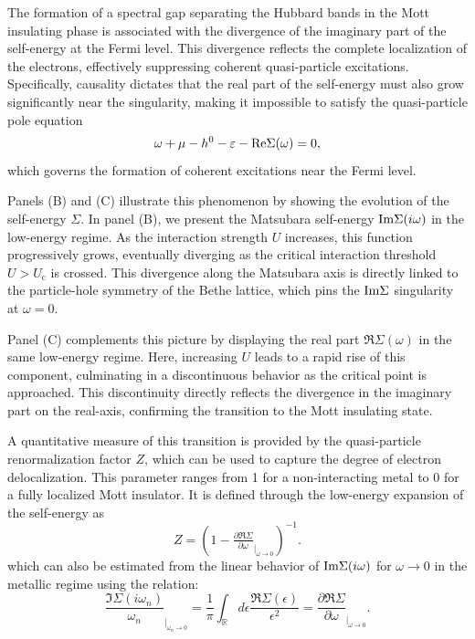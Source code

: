 \documentclass[edipack2.tex]{subfiles}
\begin{document}
The formation of a spectral gap separating the Hubbard bands in the 
Mott insulating phase is associated with the divergence of the 
imaginary part of the self-energy at the Fermi level. This divergence 
reflects the complete localization of the electrons, effectively 
suppressing coherent quasi-particle excitations. Specifically, 
causality dictates that the real part of the self-energy must also 
grow significantly near the singularity, making it impossible to 
satisfy the quasi-particle pole equation
$$
\omega+\mu-h^0-\varepsilon-{\rm Re}{\Sigma}(\omega)=0,
$$
which governs the formation of coherent excitations near the Fermi 
level.

Panels (B) and (C) illustrate this phenomenon by showing the evolution 
of the self-energy $\Sigma$. In panel (B), we present the Matsubara 
self-energy ${\rm Im}\Sigma(i\omega)$ in the low-energy regime. As the 
interaction strength $U$ increases, this function progressively 
grows, eventually diverging as the critical interaction threshold 
$U > U_\mathrm{c}$ is crossed.
This divergence along the Matsubara axis is directly linked to the
particle-hole symmetry of the Bethe lattice, which pins the  ${\rm
  Im}\Sigma$ singularity at $\omega = 0$.

Panel (C) complements this picture by displaying the real part 
$\Re{\Sigma}(\omega)$ in the same low-energy regime. Here, increasing 
$U$ leads to a rapid rise of this component, culminating in a 
discontinuous behavior as the critical point is approached. This 
discontinuity directly reflects the divergence in the imaginary part
on the real-axis,  confirming the transition to the Mott insulating state.


A quantitative measure of this transition is provided by the 
quasi-particle renormalization factor $Z$, which can be used to capture the degree 
of electron delocalization. This parameter ranges from 1 for a 
non-interacting metal to 0 for a fully localized Mott insulator. It is 
defined through the low-energy expansion of the self-energy as
$$
Z=(1-\tfrac{\partial\Re\Sigma}{\partial\omega}_{|_{\omega\rightarrow
    0}})^{-1}.
$$
which can also be estimated from the linear behavior of ${\rm Im}\Sigma(i\omega)$ for 
$\omega\to0$ in the metallic regime using the relation:
$$
   \frac{\Im\Sigma(i\omega_n)}{\omega_n}_{|_{\omega_n\rightarrow 0}}=
   \frac{1}{\pi}\int_{\mathbb R}d\epsilon \frac{\Re\Sigma(\epsilon)}{\epsilon^2}=
   \frac{\partial\Re\Sigma}{\partial\omega}_{|_{\omega\rightarrow 0}}.
$$
\end{document}
